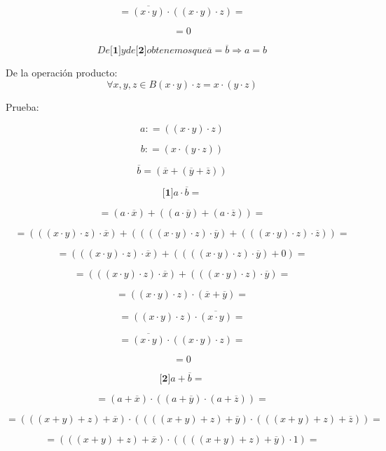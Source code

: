 \[{= {\overline{({x\cdot y})} \cdot {({{({x \cdot y})} \cdot z})}}} =\]

\[= 0\]

\[\mathit{De}{\lbrack\mathbf{1}\rbrack}y\mathit{de}{\lbrack\mathbf{2}\rbrack}\mathit{obtenemos}\mathit{que}{}{}{}{\overline{a} = \overline{b}}{}\Rightarrow{}{a = b}\]

De la operación producto:
\[\forall x,y,{z \in B}{}{}{}{{{({x \cdot y})} \cdot z} = {x \cdot {({y \cdot z})}}}\]

Prueba:

\[a{: = {({{({x \cdot y})} \cdot z})}}\]

\[b{: = {({x \cdot {({y \cdot z})}})}}\]

\[\overline{b}{}{}{}{= {({\overline{x} + {({\overline{y} + \overline{z}})}})}}\]

\[{\lbrack\mathbf{1}\rbrack}{{a \cdot \overline{b}} =}\]

\[{= {{({a \cdot \overline{x}})} + {({{({a \cdot \overline{y}})} + {({a \cdot \overline{z}})}})}}} =\]

\[{= {{({{({{({x \cdot y})} \cdot z})} \cdot \overline{x}})} + {({{({{({{({x \cdot y})} \cdot z})} \cdot \overline{y}})} + {({{({{({x \cdot y})} \cdot z})} \cdot \overline{z}})}})}}} =\]

\[{= {{({{({{({x \cdot y})} \cdot z})} \cdot \overline{x}})} + {({{({{({{({x \cdot y})} \cdot z})} \cdot \overline{y}})} + 0})}}} =\]

\[{= {{({{({{({x \cdot y})} \cdot z})} \cdot \overline{x}})} + {({{({{({x \cdot y})} \cdot z})} \cdot \overline{y}})}}} =\]

\[{= {{({{({x \cdot y})} \cdot z})} \cdot {({\overline{x} + \overline{y}})}}} =\]

\[{= {{({{({x \cdot y})} \cdot z})} \cdot \overline{({x\cdot y})}}} =\]

\[{= {\overline{({x\cdot y})} \cdot {({{({x \cdot y})} \cdot z})}}} =\]

\[= 0\]

\[{\lbrack\mathbf{2}\rbrack}{{a + \overline{b}} =}\]

\[{= {{({a + \overline{x}})} \cdot {({{({a + \overline{y}})} \cdot {({a + \overline{z}})}})}}} =\]

\[{= {{({{({{({x + y})} + z})} + \overline{x}})} \cdot {({{({{({{({x + y})} + z})} + \overline{y}})} \cdot {({{({{({x + y})} + z})} + \overline{z}})}})}}} =\]

\[{= {{({{({{({x + y})} + z})} + \overline{x}})} \cdot {({{({{({{({x + y})} + z})} + \overline{y}})} \cdot 1})}}} =\]

